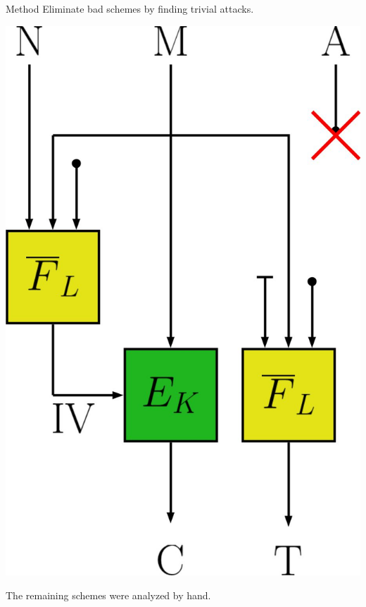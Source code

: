 \documentclass[11pt]{beamer}
\begin{document}
\begin{frame}{Method}
Eliminate bad schemes by finding trivial attacks.
\begin{center}
\includegraphics[scale=0.12]{badivae.jpg}
\end{center}
The remaining schemes were analyzed by hand.
\end{frame}
\end{document}

